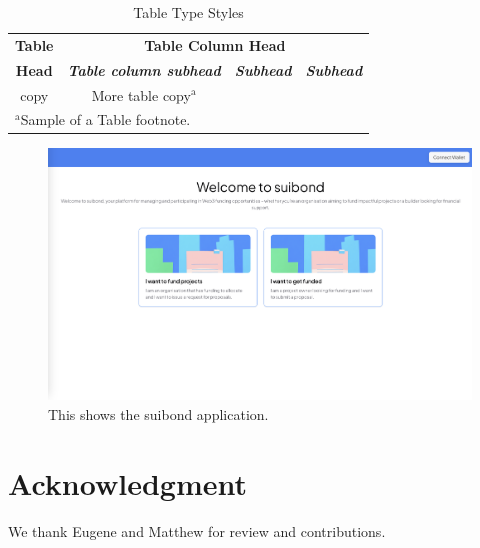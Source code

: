 \documentclass[conference]{IEEEtran}
\begin{document}
\begin{table}[htbp]
\caption{Table Type Styles}
\begin{center}
\begin{tabular}{|c|c|c|c|}
\hline
\textbf{Table}&\multicolumn{3}{|c|}{\textbf{Table Column Head}} \\
\cline{2-4} 
\textbf{Head} & \textbf{\textit{Table column subhead}}& \textbf{\textit{Subhead}}& \textbf{\textit{Subhead}} \\
\hline
copy& More table copy$^{\mathrm{a}}$& &  \\
\hline
\multicolumn{4}{l}{$^{\mathrm{a}}$Sample of a Table footnote.}
\end{tabular}
\label{tab1}
\end{center}
\end{table}

\begin{figure}[htbp]
\centerline{\includegraphics[scale=0.1]{suibond.png}}
\caption{This shows the suibond application.}
\label{fig}
\end{figure}


\section*{Acknowledgment}

We thank Eugene and Matthew for review and contributions.
\end{document}
